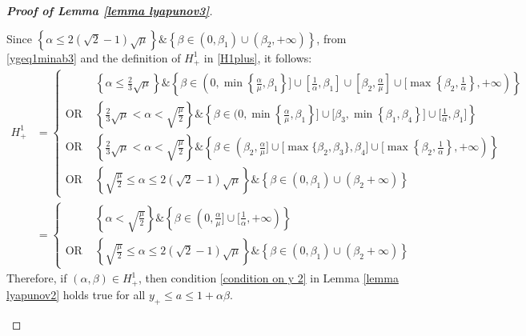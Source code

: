\documentclass[reqno]{amsart}
\theoremstyle{plain}
\theoremstyle{definition}
\theoremstyle{remark}
\begin{document}
\begin{proof}[\textbf{Proof of Lemma \ref{lemma lyapunov3}}]
\begin{itemize}[wide=0pt]
\begin{itemize}[wide=5pt]
			Since $\left\{\alpha\leq 2(\sqrt{2}-1)\sqrt{\mu}\right\}\&\left\{\beta\in (0,\beta_{1})\cup(\beta_{2},+\infty)\right\}$, from \eqref{ygeq1minab3} and the definition of $H_{+}^{1}$ in \eqref{H1plus}, it follows:
			\begin{equation}\label{H1plusfinal}
				\begin{aligned}
					H_{+}^{1} &=\begin{cases}
						& \left\{\alpha\leq \frac{2}{3}\sqrt{\mu}\right\}\&\left\{\beta \in (0,\min\left\{\frac{\alpha}{\mu},\beta_{1}\right\}\big]\cup\left[\frac{1}{\alpha},\beta_{1}\right]\cup\left[\beta_{2},\frac{\alpha}{\mu}\right]\cup\big[\max\left\{\beta_{2},\frac{1}{\alpha}\right\},+\infty)\right\} \\
						\text{OR } &
						\left\{ \frac{2}{3}\sqrt{\mu} < \alpha <\sqrt{\frac{\mu}{2}}\right\} \& \left\{\beta\in (0, \min\left\{\frac{\alpha}{\mu},\beta_{1}\right\}\big]\cup\big[\beta_{3},\min\left\{\beta_{1},\beta_{4}\right\}\big]\cup\big[\frac{1}{\alpha},\beta_{1}\big] \right\} \\
						\text{OR } &   \left\{ \frac{2}{3}\sqrt{\mu} < \alpha <\sqrt{\frac{\mu}{2}}\right\} \& \left\{\beta\in (\beta_{2}, \frac{\alpha}{\mu}\big]\cup\big[\max\{\beta_{2},\beta_{3}\},\beta_{4}\big]\cup\big[\max\left\{\beta_{2},\frac{1}{\alpha}\right\},+\infty) \right\}                                       \\
						\text{OR } & \left\{\sqrt{\frac{\mu}{2}}\leq \alpha \leq  2(\sqrt{2}-1)\sqrt{\mu}\right\}\&\left\{\beta\in(0,\beta_{1})\cup(\beta_{2}+\infty)\right\} 
					\end{cases} \\
					&= \begin{cases}
						& \left\{  \alpha <\sqrt{\frac{\mu}{2}}\right\} \& \left\{\beta\in (0, \frac{\alpha}{\mu}\big]\cup \big[\frac{1}{\alpha},+\infty) \right\} \\
						\text{OR } & \left\{\sqrt{\frac{\mu}{2}}\leq \alpha \leq  2(\sqrt{2}-1)\sqrt{\mu}\right\}\&\left\{\beta\in(0,\beta_{1})\cup(\beta_{2}+\infty)\right\} 
					\end{cases}
				\end{aligned}
			\end{equation}
			Therefore, if $(\alpha,\beta)\in H_{+}^{1}$, then condition \eqref{condition on y 2} in Lemma \ref{lemma lyapunov2} holds true for all $y_{+}\leq a\leq 1+\alpha\beta$.
			

\end{itemize}
\end{itemize}
\end{proof}
\end{document}
